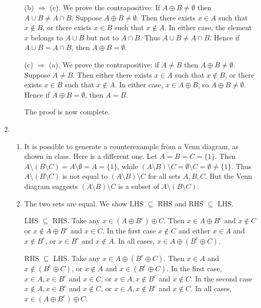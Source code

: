 \documentclass[12 pt]{article}
\begin{document}
\begin{enumerate}
\begin{enumerate}
\smallskip
(b) $\Rightarrow$ (c). We prove the contrapositive: If $A \oplus B \neq \emptyset$ then $A \cup B \neq A \cap B$.
Suppose $A \oplus B \neq \emptyset$.
Then there exists $x \in A$ such that $x \not\in B$, or there exists $x \in B$ such that $x \not\in A$.
In either case, the element $x$ belongs to $A \cup B$ but not to $A \cap B$.
Thus  $A \cup B \neq A \cap B$.
Hence if $A \cup B = A \cap B$, then $A \oplus B = \emptyset$.

\smallskip
(c) $\Rightarrow$ (a).
We prove the contrapositive: if $A \neq B$ then $A \oplus B \neq \emptyset$.
Suppose $A \neq B$.
Then either there exists $x \in A$ such that $x \not\in B$, or there exists $x \in B$ such that $x \not\in A$.
In either case, $x \in A \oplus B$, so $A \oplus B \neq \emptyset$.
Hence if $A \oplus B = \emptyset$, then $A = B$.

\smallskip
The proof is now complete.
 \end{enumerate}

\item \begin{enumerate}
\item It is possible to generate a counterexample from a Venn diagram, as shown in class.  Here is a 
different one.  Let $A = B = C = \{1\}$.
Then $A \setminus (B \setminus C) = A \setminus \emptyset = A = \{1\}$, while
$(A \setminus B) \setminus C = \emptyset \setminus C = \emptyset \neq \{1\}$.
Thus $A \setminus (B \setminus C)$ is not equal to $(A \setminus B) \setminus C$ for all sets $A, B, C$.
But the Venn diagram suggests $(A \setminus B) \setminus C$ is a subset of $A \setminus (B \setminus C)$.

\item The two sets are equal. We show 
LHS $\subseteq$  RHS and RHS $\subseteq$ LHS.

\smallskip
LHS $\subseteq$  RHS.
Take any $x \in (A \oplus B^c) \oplus C$.
Then $x \in A \oplus B^c$ and $x \not\in C$ or $x \not\in A \oplus B^c$ and $x \in C$.
In the first case $x \not\in C$ and either $x \in A$ and $x \not\in B^c$, or $x \in B^c$ and $x \not\in A$.
In all cases, $x \in A \oplus (B^c \oplus C)$.

\smallskip
RHS $\subseteq$ LHS.
Take any $x \in  A \oplus (B^c \oplus C)$.
Then $x \in A$ and $x \not\in (B^c \oplus C)$, or  $x \not\in A$ and $x \in (B^c \oplus C)$.
In the first case, $x \in A, x \in B^c$ and $x \in C$, or $x \in A, x \not\in B^c$ and $x \not\in C$.
In the second case $x \not\in A, x \in B^c$ and $x \not\in C$, or $x \in A, x \not\in B^c$ and $x \not\in C$.
In all cases, $x \in (A \oplus B^c) \oplus C$.


\end{enumerate}
\end{enumerate}
\end{document}
